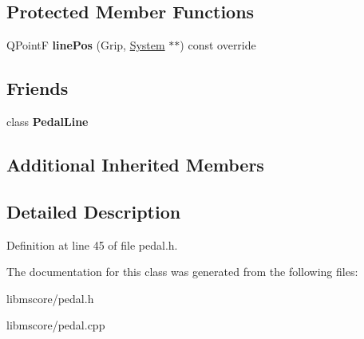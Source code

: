 \subsection*{Protected Member Functions}
\begin{DoxyCompactItemize}
\item 
\mbox{\label{class_ms_1_1_pedal_a35d245d057d34bb6633c80d51a079321}} 
Q\+PointF {\bfseries line\+Pos} (Grip, \hyperlink{class_ms_1_1_system}{System} $\ast$$\ast$) const override
\end{DoxyCompactItemize}
\subsection*{Friends}
\begin{DoxyCompactItemize}
\item 
\mbox{\label{class_ms_1_1_pedal_a183a0e280f52e1ccba93516ee51ffcea}} 
class {\bfseries Pedal\+Line}
\end{DoxyCompactItemize}
\subsection*{Additional Inherited Members}


\subsection{Detailed Description}


Definition at line 45 of file pedal.\+h.



The documentation for this class was generated from the following files\+:\begin{DoxyCompactItemize}
\item 
libmscore/pedal.\+h\item 
libmscore/pedal.\+cpp\end{DoxyCompactItemize}
